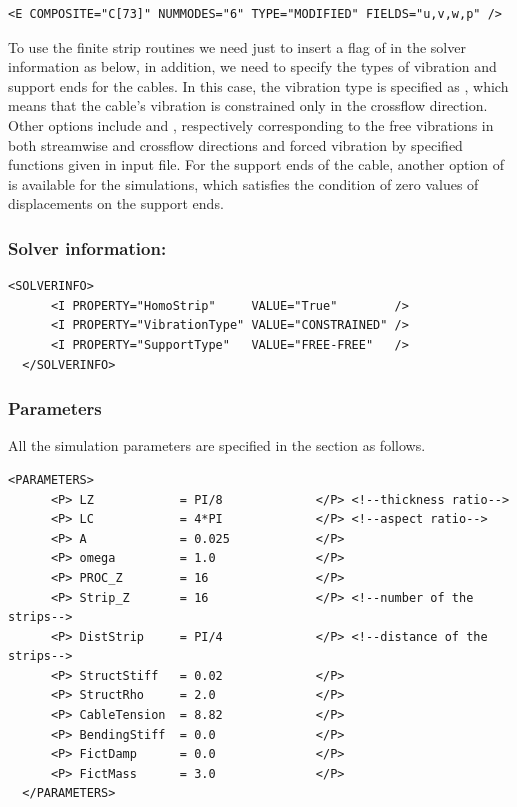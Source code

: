 \begin{lstlisting}[style=XMLStyle]
<E COMPOSITE="C[73]" NUMMODES="6" TYPE="MODIFIED" FIELDS="u,v,w,p" />
\end{lstlisting}

To use the finite strip routines we need just to insert a flag of  in the solver information as below, in addition, we need to specify the types of vibration and support ends for the cables. In this case, the vibration type is specified as , which means that the cable's vibration is constrained only in the crossflow direction. Other options include  and , respectively corresponding to the free vibrations in both streamwise and crossflow directions and forced vibration by specified functions given in input file. For the support ends of the cable, another option of  is available for the simulations, which satisfies the condition of zero values of displacements on the support ends.

\subsubsection{Solver information:~}
\begin{lstlisting}[style=XMLStyle]
  <SOLVERINFO>
      <I PROPERTY="HomoStrip"     VALUE="True"        />
      <I PROPERTY="VibrationType" VALUE="CONSTRAINED" />
      <I PROPERTY="SupportType"   VALUE="FREE-FREE"   />
  </SOLVERINFO>
\end{lstlisting}
        
\subsubsection{Parameters}

All the simulation parameters are specified in the section as follows.

    \begin{lstlisting}[style=XMLStyle]
  <PARAMETERS>
      <P> LZ            = PI/8             </P> <!--thickness ratio-->
      <P> LC            = 4*PI             </P> <!--aspect ratio-->
      <P> A             = 0.025            </P>
      <P> omega         = 1.0              </P>
      <P> PROC_Z        = 16               </P>
      <P> Strip_Z       = 16               </P> <!--number of the strips-->
      <P> DistStrip     = PI/4             </P> <!--distance of the strips-->
      <P> StructStiff   = 0.02             </P>  
      <P> StructRho     = 2.0              </P>
      <P> CableTension  = 8.82             </P>
      <P> BendingStiff  = 0.0              </P>
      <P> FictDamp      = 0.0              </P>
      <P> FictMass      = 3.0              </P>
  </PARAMETERS>
     \end{lstlisting}    

